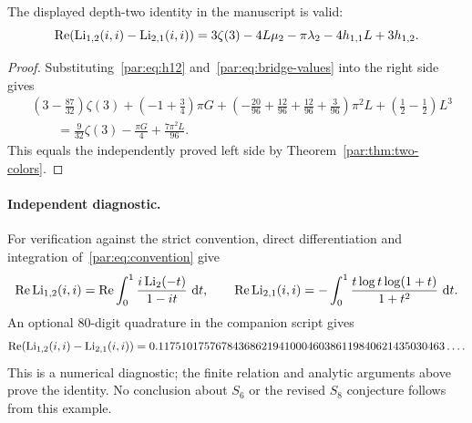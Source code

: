 \begin{corollary}\label{par:cor:family2-printed}
The displayed depth-two identity in the manuscript is valid:
\begin{equation}\label{par:eq:family2-printed}
 \operatorname{Re}\!\left(\operatorname{Li}_{1,2}(i,i)-\operatorname{Li}_{2,1}(i,i)\right)
 =3\zeta(3)-4L\mu_2-\pi\lambda_2-4h_{1,1}L+3h_{1,2}.
\end{equation}
\end{corollary}
\begin{proof}
Substituting~\eqref{par:eq:h12} and~\eqref{par:eq:bridge-values} into the
right side gives
\begin{align*}
 &\left(3-\frac{87}{32}\right)\zeta(3)
 +\left(-1+\frac34\right)\pi G
 +\left(-\frac{20}{96}+\frac{12}{96}
          +\frac{12}{96}+\frac3{96}\right)\pi^2L
 +\left(\frac12-\frac12\right)L^3\\
 &\qquad=\frac9{32}\zeta(3)-\frac{\pi G}{4}
                 +\frac{7\pi^2L}{96}.
\end{align*}
This equals the independently proved left side by
Theorem~\ref{par:thm:two-colors}.
\end{proof}

\paragraph{Independent diagnostic.}
For verification against the strict convention, direct differentiation
and integration of~\eqref{par:eq:convention} give
\[
 \operatorname{Re}\operatorname{Li}_{1,2}(i,i)
 =\operatorname{Re}\int_0^1\frac{i\operatorname{Li}_2(-t)}{1-it}\,\,\mathrm d t,
 \qquad
 \operatorname{Re}\operatorname{Li}_{2,1}(i,i)
 =-\int_0^1\frac{t\log t\log(1+t)}{1+t^2}\,\,\mathrm d t.
\]
An optional $80$-digit quadrature in the companion script gives
\[
 \operatorname{Re}\!\left(\operatorname{Li}_{1,2}(i,i)-\operatorname{Li}_{2,1}(i,i)\right)
 =0.11751017576784368621941000460386119840621435030463\ldots.
\]
This is a numerical diagnostic; the finite relation and analytic
arguments above prove the identity. No conclusion about $S_6$ or the
revised $S_8$ conjecture follows from this example.
